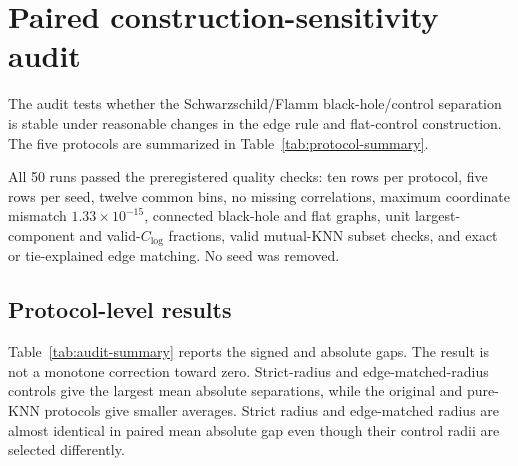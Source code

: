 \documentclass[11pt]{article}
\newcommand{\clog}{C_{\log}}
\begin{document}
\section{Paired construction-sensitivity audit}
\label{sec:construction-audit}

The audit tests whether the Schwarzschild/Flamm black-hole/control separation is
stable under reasonable changes in the edge rule and flat-control construction.
The five protocols are summarized in Table~\ref{tab:protocol-summary}.

\begin{table}[H]
\centering
\caption{Graph-construction and matched-control protocols used in the paired
ten-seed audit.}
\label{tab:protocol-summary}
\small
\setlength{\tabcolsep}{4pt}
\end{table}

All 50 runs passed the preregistered quality checks: ten rows per protocol,
five rows per seed, twelve common bins, no missing correlations, maximum
coordinate mismatch $1.33\times10^{-15}$, connected black-hole and flat graphs,
unit largest-component and valid-$\clog$ fractions, valid mutual-KNN subset
checks, and exact or tie-explained edge matching. No seed was removed.

\subsection{Protocol-level results}

Table~\ref{tab:audit-summary} reports the signed and absolute gaps. The result
is not a monotone correction toward zero. Strict-radius and edge-matched-radius
controls give the largest mean absolute separations, while the original and
pure-KNN protocols give smaller averages. Strict radius and edge-matched radius
are almost identical in paired mean absolute gap even though their control
radii are selected differently.
\end{document}
